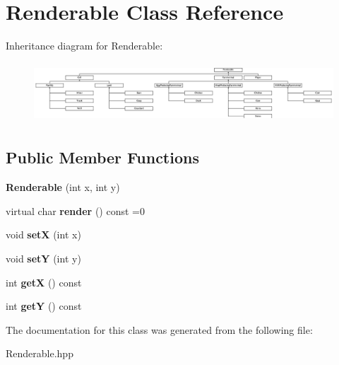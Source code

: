 \hypertarget{class_renderable}{}\section{Renderable Class Reference}
\label{class_renderable}
Inheritance diagram for Renderable\+:\begin{figure}[H]
\begin{center}
\leavevmode
\includegraphics[height=2.265896cm]{class_renderable}
\end{center}
\end{figure}
\subsection*{Public Member Functions}
\begin{DoxyCompactItemize}
\item 
\mbox{\label{class_renderable_a8d14de163e3e6ba3d87fa8a73ad7b063}} 
{\bfseries Renderable} (int x, int y)
\item 
\mbox{\label{class_renderable_af09cff67767ca4645ff24aa6cab84be6}} 
virtual char {\bfseries render} () const =0
\item 
\mbox{\label{class_renderable_a3e8517109ed3e4918d7d838e25c660a1}} 
void {\bfseries setX} (int x)
\item 
\mbox{\label{class_renderable_a521de229b0e0d647d7d9196421eaad1a}} 
void {\bfseries setY} (int y)
\item 
\mbox{\label{class_renderable_adf8b600a2eccd6f21e504d3025ed655c}} 
int {\bfseries getX} () const
\item 
\mbox{\label{class_renderable_a7eb82850bbd3ed66bba420607794dc78}} 
int {\bfseries getY} () const
\end{DoxyCompactItemize}


The documentation for this class was generated from the following file\+:\begin{DoxyCompactItemize}
\item 
Renderable.\+hpp\end{DoxyCompactItemize}
